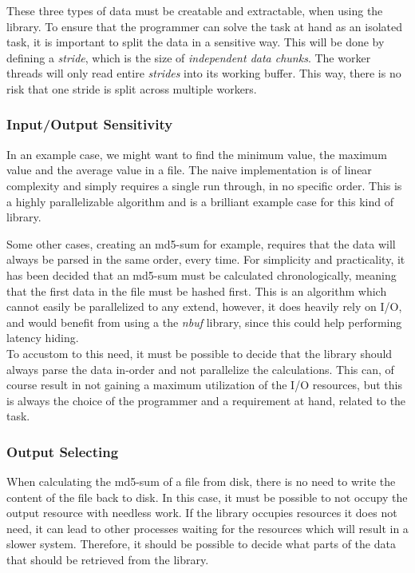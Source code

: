 \documentclass[a4paper]{article}
\newcommand{\nbuf}{\textit{nbuf} }
\begin{document}
These three types of data must be creatable and extractable, when using the library. To ensure that the programmer can solve the task at hand as an isolated task, it is important to split the data in a sensitive way. This will be done by defining a \textit{stride}, which is the size of \textit{independent data chunks}. The worker threads will only read entire \textit{strides} into its working buffer. This way, there is no risk that one stride is split across multiple workers. 


\subsubsection{Input/Output Sensitivity}
In an example case, we might want to find the minimum value, the maximum value and the average value in a file. The naive implementation is of linear complexity and simply requires a single run through, in no specific order. This is a highly parallelizable algorithm and is a brilliant example case for this kind of library. 

Some other cases, creating an md5-sum for example, requires that the data will always be parsed in the same order, every time. For simplicity and practicality, it has been decided that an md5-sum must be calculated chronologically, meaning that the first data in the file must be hashed first. This is an algorithm which cannot easily be parallelized to any extend, however, it does heavily rely on I/O, and would benefit from using a the \nbuf library, since this could help performing latency hiding.\\

To accustom to this need, it must be possible to decide that the library should always parse the data in-order and not parallelize the calculations. This can, of course result in not gaining a maximum utilization of the I/O resources, but this is always the choice of the programmer and a requirement at hand, related to the task. 


\subsubsection{Output Selecting}
When calculating the md5-sum of a file from disk, there is no need to write the content of the file back to disk. In this case, it must be possible to not occupy the output resource with needless work. If the library occupies resources it does not need, it can lead to other processes waiting for the resources which will result in a slower system. Therefore, it should be possible to decide what parts of the data that should be retrieved from the library.
\end{document}
